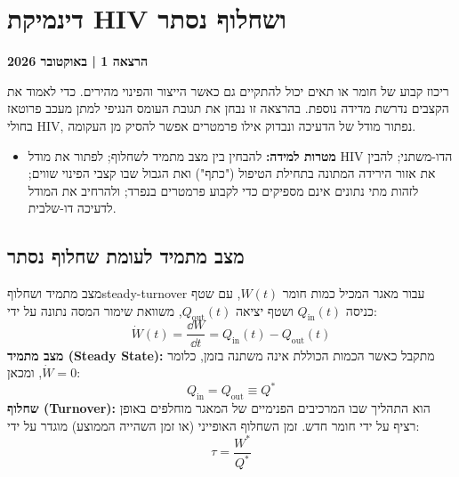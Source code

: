
\chapter{דינמיקת HIV ושחלוף נסתר}\label{chap:hiv-dynamics}
\noindent\textbf{הרצאה 1 \enspace| באוקטובר 2026}

\vspace{0.5em}
ריכוז קבוע של חומר או תאים יכול להתקיים גם כאשר הייצור והפינוי מהירים. כדי לאמוד את הקצבים נדרשת מדידה נוספת. בהרצאה זו נבחן את תגובת העומס הנגיפי למתן מעכב פרוטאז בחולי HIV, נפתור מודל של הדעיכה ונבדוק אילו פרמטרים אפשר להסיק מן העקומה.

\begin{itemize}[nosep]
\item \textbf{מטרות למידה:} להבחין בין מצב מתמיד לשחלוף; לפתור את מודל HIV הדו-משתני; להבין את אזור הירידה המתונה בתחילת הטיפול ("כתף") ואת הגבול שבו קצבי הפינוי שווים; לזהות מתי נתונים אינם מספיקים כדי לקבוע פרמטרים בנפרד; ולהרחיב את המודל לדעיכה דו-שלבית.
\end{itemize}

\section{מצב מתמיד לעומת שחלוף נסתר}\label{sec:steady-turnover}

\begin{definition}{מצב מתמיד ושחלוף}{steady-turnover}
עבור מאגר המכיל כמות חומר $W(t)$, עם שטף כניסה $Q_{\mathrm{in}}(t)$ ושטף יציאה $Q_{\mathrm{out}}(t)$, משוואת שימור המסה נתונה על ידי:
\begin{equation}\label{eq:mass-balance}
\dot{W}(t) = \frac{\dd W}{\dd t} = Q_{\mathrm{in}}(t) - Q_{\mathrm{out}}(t)
\end{equation}
\textbf{מצב מתמיד (\textenglish{Steady State}):} מתקבל כאשר הכמות הכוללת אינה משתנה בזמן, כלומר $\dot{W} = 0$, ומכאן:
\begin{equation}\label{eq:steady-balance}
Q_{\mathrm{in}} = Q_{\mathrm{out}} \equiv Q^*
\end{equation}
\textbf{שחלוף (\textenglish{Turnover}):} הוא התהליך שבו המרכיבים הפנימיים של המאגר מוחלפים באופן רציף על ידי חומר חדש. זמן השחלוף האופייני (או זמן השהייה הממוצע) מוגדר על ידי:
\begin{equation}\label{eq:turnover-time}
\tau = \frac{W^*}{Q^*}
\end{equation}
\end{definition}


